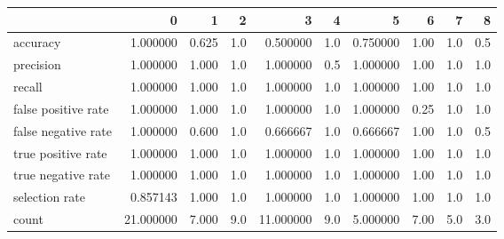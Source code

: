 \begin{tabular}{lrrrrrrrrr}
\toprule
{} &          0 &      1 &    2 &          3 &    4 &         5 &     6 &    7 &    8 \\
\midrule
accuracy            &   1.000000 &  0.625 &  1.0 &   0.500000 &  1.0 &  0.750000 &  1.00 &  1.0 &  0.5 \\
precision           &   1.000000 &  1.000 &  1.0 &   1.000000 &  0.5 &  1.000000 &  1.00 &  1.0 &  1.0 \\
recall              &   1.000000 &  1.000 &  1.0 &   1.000000 &  1.0 &  1.000000 &  1.00 &  1.0 &  1.0 \\
false positive rate &   1.000000 &  1.000 &  1.0 &   1.000000 &  1.0 &  1.000000 &  0.25 &  1.0 &  1.0 \\
false negative rate &   1.000000 &  0.600 &  1.0 &   0.666667 &  1.0 &  0.666667 &  1.00 &  1.0 &  0.5 \\
true positive rate  &   1.000000 &  1.000 &  1.0 &   1.000000 &  1.0 &  1.000000 &  1.00 &  1.0 &  1.0 \\
true negative rate  &   1.000000 &  1.000 &  1.0 &   1.000000 &  1.0 &  1.000000 &  1.00 &  1.0 &  1.0 \\
selection rate      &   0.857143 &  1.000 &  1.0 &   1.000000 &  1.0 &  1.000000 &  1.00 &  1.0 &  1.0 \\
count               &  21.000000 &  7.000 &  9.0 &  11.000000 &  9.0 &  5.000000 &  7.00 &  5.0 &  3.0 \\
\bottomrule
\end{tabular}
